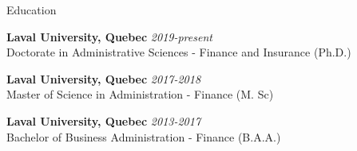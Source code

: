 \documentclass{resume} %
\begin{document}

\begin{rSection}{Education}

{\bf Laval University, Quebec} \hfill {\em 2019-present} \\ 
Doctorate in Administrative Sciences - Finance and Insurance (Ph.D.) 
\smallskip 

{\bf Laval University, Quebec} \hfill {\em 2017-2018} \\ 
Master of Science in Administration - Finance (M. Sc)
\smallskip 

{\bf Laval University, Quebec} \hfill {\em 2013-2017} \\ 
Bachelor of Business Administration - Finance (B.A.A.)
\smallskip 
\end{rSection}

\end{document}
